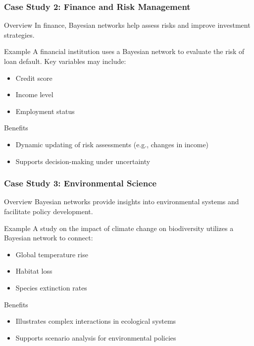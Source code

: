 \documentclass[aspectratio=169]{beamer}
\begin{document}
\begin{frame}[fragile]
    \frametitle{Case Study 2: Finance and Risk Management}
    \begin{block}{Overview}
    In finance, Bayesian networks help assess risks and improve investment strategies.
    \end{block}

    \begin{block}{Example}
    A financial institution uses a Bayesian network to evaluate the risk of loan default. Key variables may include:
    \begin{itemize}
        \item Credit score
        \item Income level
        \item Employment status
    \end{itemize}
    \end{block}

    \begin{block}{Benefits}
    \begin{itemize}
        \item Dynamic updating of risk assessments (e.g., changes in income)
        \item Supports decision-making under uncertainty
    \end{itemize}
    \end{block}
\end{frame}

\begin{frame}[fragile]
    \frametitle{Case Study 3: Environmental Science}
    \begin{block}{Overview}
    Bayesian networks provide insights into environmental systems and facilitate policy development.
    \end{block}

    \begin{block}{Example}
    A study on the impact of climate change on biodiversity utilizes a Bayesian network to connect:
    \begin{itemize}
        \item Global temperature rise
        \item Habitat loss
        \item Species extinction rates
    \end{itemize}
    \end{block}

    \begin{block}{Benefits}
    \begin{itemize}
        \item Illustrates complex interactions in ecological systems
        \item Supports scenario analysis for environmental policies
    \end{itemize}
    \end{block}
\end{frame}
\end{document}
